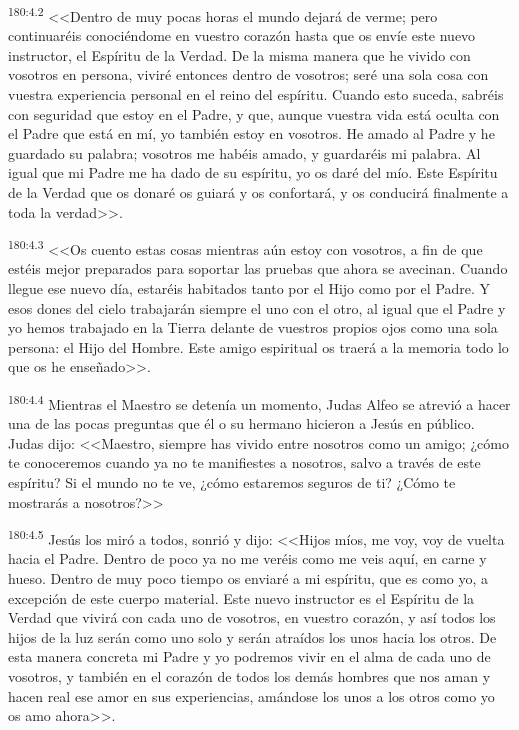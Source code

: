 \par 
\textsuperscript{180:4.2} <<Dentro de muy pocas horas el mundo dejará de verme; pero continuaréis conociéndome en vuestro corazón hasta que os envíe este nuevo instructor, el Espíritu de la Verdad. De la misma manera que he vivido con vosotros en persona, viviré entonces dentro de vosotros; seré una sola cosa con vuestra experiencia personal en el reino del espíritu. Cuando esto suceda, sabréis con seguridad que estoy en el Padre, y que, aunque vuestra vida está oculta con el Padre que está en mí, yo también estoy en vosotros. He amado al Padre y he guardado su palabra; vosotros me habéis amado, y guardaréis mi palabra. Al igual que mi Padre me ha dado de su espíritu, yo os daré del mío. Este Espíritu de la Verdad que os donaré os guiará y os confortará, y os conducirá finalmente a toda la verdad>>.

\par 
\textsuperscript{180:4.3} <<Os cuento estas cosas mientras aún estoy con vosotros, a fin de que estéis mejor preparados para soportar las pruebas que ahora se avecinan. Cuando llegue ese nuevo día, estaréis habitados tanto por el Hijo como por el Padre. Y esos dones del cielo trabajarán siempre el uno con el otro, al igual que el Padre y yo hemos trabajado en la Tierra delante de vuestros propios ojos como una sola persona: el Hijo del Hombre. Este amigo espiritual os traerá a la memoria todo lo que os he enseñado>>.

\par 
\textsuperscript{180:4.4} Mientras el Maestro se detenía un momento, Judas Alfeo se atrevió a hacer una de las pocas preguntas que él o su hermano hicieron a Jesús en público. Judas dijo: <<Maestro, siempre has vivido entre nosotros como un amigo; ¿cómo te conoceremos cuando ya no te manifiestes a nosotros, salvo a través de este espíritu? Si el mundo no te ve, ¿cómo estaremos seguros de ti? ¿Cómo te mostrarás a nosotros?>>

\par 
\textsuperscript{180:4.5} Jesús los miró a todos, sonrió y dijo: <<Hijos míos, me voy, voy de vuelta hacia el Padre. Dentro de poco ya no me veréis como me veis aquí, en carne y hueso. Dentro de muy poco tiempo os enviaré a mi espíritu, que es como yo, a excepción de este cuerpo material. Este nuevo instructor es el Espíritu de la Verdad que vivirá con cada uno de vosotros, en vuestro corazón, y así todos los hijos de la luz serán como uno solo y serán atraídos los unos hacia los otros. De esta manera concreta mi Padre y yo podremos vivir en el alma de cada uno de vosotros, y también en el corazón de todos los demás hombres que nos aman y hacen real ese amor en sus experiencias, amándose los unos a los otros como yo os amo ahora>>.

